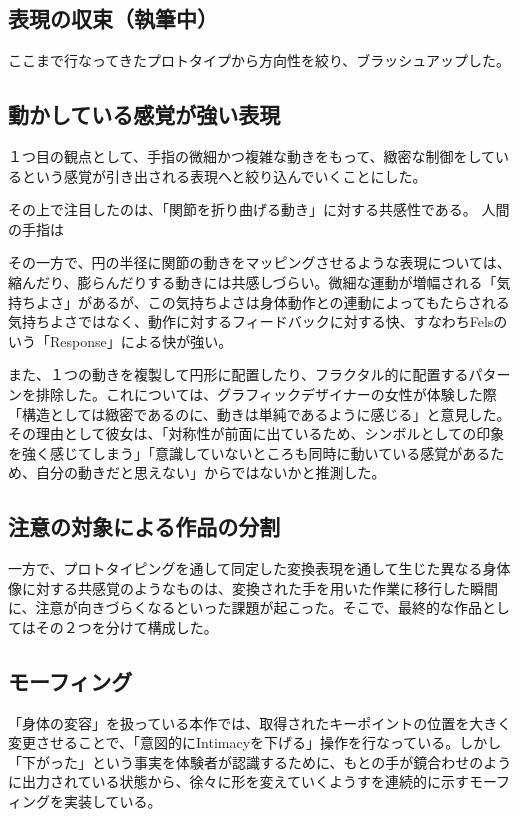 \subsection{表現の収束（執筆中）}
ここまで行なってきたプロトタイプから方向性を絞り、ブラッシュアップした。
\subsection*{動かしている感覚が強い表現}
１つ目の観点として、手指の微細かつ複雑な動きをもって、緻密な制御をしているという感覚が引き出される表現へと絞り込んでいくことにした。

その上で注目したのは、「関節を折り曲げる動き」に対する共感性である。
人間の手指は

その一方で、円の半径に関節の動きをマッピングさせるような表現については、縮んだり、膨らんだりする動きには共感しづらい。微細な運動が増幅される「気持ちよさ」があるが、この気持ちよさは身体動作との連動によってもたらされる気持ちよさではなく、動作に対するフィードバックに対する快、すなわちFelsのいう「Response」による快が強い。

また、１つの動きを複製して円形に配置したり、フラクタル的に配置するパターンを排除した。これについては、グラフィックデザイナーの女性が体験した際「構造としては緻密であるのに、動きは単純であるように感じる」と意見した。その理由として彼女は、「対称性が前面に出ているため、シンボルとしての印象を強く感じてしまう」「意識していないところも同時に動いている感覚があるため、自分の動きだと思えない」からではないかと推測した。

\subsection*{注意の対象による作品の分割}
一方で、プロトタイピングを通して同定した変換表現を通して生じた異なる身体像に対する共感覚のようなものは、変換された手を用いた作業に移行した瞬間に、注意が向きづらくなるといった課題が起こった。そこで、最終的な作品としてはその２つを分けて構成した。

\subsection*{モーフィング}
「身体の変容」を扱っている本作では、取得されたキーポイントの位置を大きく変更させることで、「意図的にIntimacyを下げる」操作を行なっている。しかし「下がった」という事実を体験者が認識するために、もとの手が鏡合わせのように出力されている状態から、徐々に形を変えていくようすを連続的に示すモーフィングを実装している。

